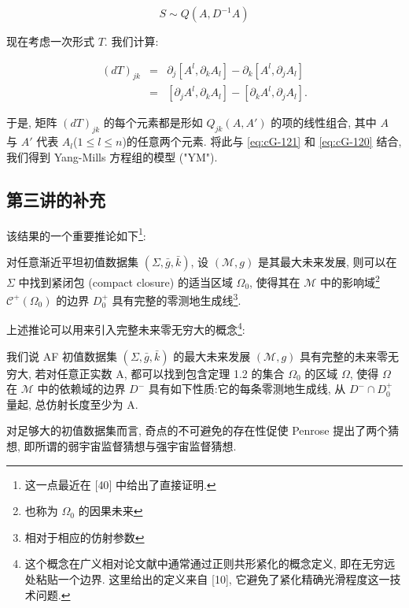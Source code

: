 \begin{equation}
S \sim Q(A,  D^{-1}A)\label{eq:cG-121}
\end{equation}

现在考虑一次形式 $T$. 我们计算:

\[
\begin{array}{rcl}
(dT)_{jk} &=& \partial_{j}[A^{l},  \partial_{k}A_{l}] - \partial_{k}[A^{l},  \partial_{j}A_{l}] \\
&=& [\partial_{j}A^{l},  \partial_{k}A_{l}] - [\partial_{k}A^{l},  \partial_{j}A_{l}].
\end{array}
\]

于是, 矩阵 $(dT)_{jk}$ 的每个元素都是形如 $Q_{jk}(A, A')$ 的项的线性组合, 其中 $A$ 与 $A'$ 代表 $A_{l}$($1 \leq l \leq n$)的任意两个元素. 将此与 \eqref{eq:cG-121} 和 \eqref{eq:cG-120} 结合, 我们得到 Yang-Mills 方程组的模型 ("YM"). 
\subsection{第三讲的补充}

该结果的一个重要推论如下\footnote{这一点最近在 {[}40{]} 中给出了直接证明. }:

\begin{theorem}\label{thm:cG-6.1}
对任意渐近平坦初值数据集 $(\Sigma, \bar{g}, \bar{k})$, 设 $(\mathcal{M}, g)$ 是其最大未来发展, 则可以在 $\Sigma$ 中找到紧闭包 (compact closure) 的适当区域 $\Omega_{0}$, 使得其在 $\mathcal{M}$ 中的影响域\footnote{也称为 $\Omega_{0}$ 的因果未来}$\mathcal{C}^{+}(\Omega_{0})$ 的边界 $D_{0}^{+}$ 具有完整的零测地生成线\footnote{相对于相应的仿射参数}. 
\end{theorem}

上述推论可以用来引入完整未来零无穷大的概念\footnote{这个概念在广义相对论文献中通常通过正则共形紧化的概念定义, 即在无穷远处粘贴一个边界. 这里给出的定义来自 {[}10{]}, 它避免了紧化精确光滑程度这一技术问题. }:

\begin{definition}\label{def:cG-6.2}
我们说 AF 初值数据集 $(\Sigma,  \bar{g},  \bar{k})$ 的最大未来发展 $(\mathcal{M},  g)$ 具有完整的未来零无穷大, 若对任意正实数 A, 都可以找到包含定理 1.2 的集合 $\Omega_{0}$ 的区域 $\Omega$, 使得 $\Omega$ 在 $\mathcal{M}$ 中的依赖域的边界 $D^{-}$ 具有如下性质:它的每条零测地生成线, 从 $D^{-} \cap D_{0}^{+}$ 量起, 总仿射长度至少为 A. 
\end{definition}

对足够大的初值数据集而言, 奇点的不可避免的存在性促使 Penrose 提出了两个猜想, 即所谓的弱宇宙监督猜想与强宇宙监督猜想. 

